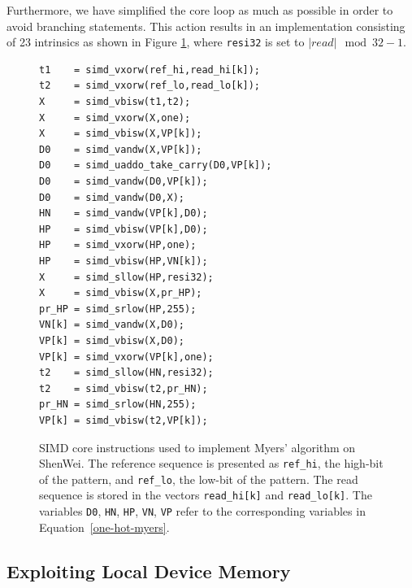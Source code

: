 Furthermore, we have simplified the core loop as much as possible in
order to avoid branching statements. This action results in an
implementation consisting of 23 intrinsics as shown in Figure
\ref{cores}, where \texttt{resi32} is set to $|read|\mod 32 - 1$.

\begin{figure}[!htb]
    \begin{lstlisting}[frame=single, xleftmargin=3.5ex]
t1    = simd_vxorw(ref_hi,read_hi[k]);
t2    = simd_vxorw(ref_lo,read_lo[k]);
X     = simd_vbisw(t1,t2); 
X     = simd_vxorw(X,one); 
X     = simd_vbisw(X,VP[k]);
D0    = simd_vandw(X,VP[k]);
D0    = simd_uaddo_take_carry(D0,VP[k]);
D0    = simd_vandw(D0,VP[k]);
D0    = simd_vandw(D0,X);
HN    = simd_vandw(VP[k],D0);
HP    = simd_vbisw(VP[k],D0);
HP    = simd_vxorw(HP,one);
HP    = simd_vbisw(HP,VN[k]);	
X     = simd_sllow(HP,resi32);
X     = simd_vbisw(X,pr_HP);
pr_HP = simd_srlow(HP,255);
VN[k] = simd_vandw(X,D0);
VP[k] = simd_vbisw(X,D0);
VP[k] = simd_vxorw(VP[k],one);
t2    = simd_sllow(HN,resi32);
t2    = simd_vbisw(t2,pr_HN);
pr_HN = simd_srlow(HN,255);
VP[k] = simd_vbisw(t2,VP[k]);	
    \end{lstlisting}
    \caption{SIMD core instructions used to implement Myers' algorithm
      on ShenWei. The reference sequence is presented as
      \texttt{ref\_hi}, the high-bit of the pattern, and
      \texttt{ref\_lo}, the low-bit of the pattern. The read sequence
      is stored in the vectors \texttt{read\_hi[k]} and
      \texttt{read\_lo[k]}. The variables \texttt{D0}, \texttt{HN},
      \texttt{HP}, \texttt{VN}, \texttt{VP} refer to the corresponding
      variables in Equation~\ref{one-hot-myers}.}
    \label{cores}
\end{figure}

\subsection{Exploiting Local Device Memory}

